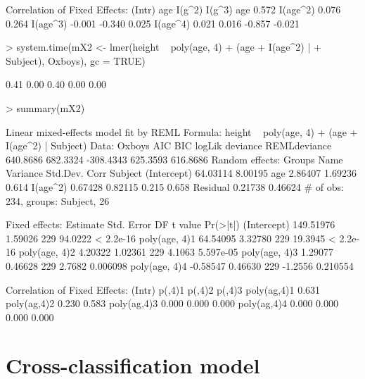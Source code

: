 \documentclass[12pt]{article}
\begin{document}
\begin{Schunk}
\begin{Soutput}
Correlation of Fixed Effects:
         (Intr) age    I(g^2) I(g^3)
age       0.572                     
I(age^2)  0.076  0.264              
I(age^3) -0.001 -0.340  0.025       
I(age^4)  0.021  0.016 -0.857 -0.021
\end{Soutput}
\begin{Sinput}
> system.time(mX2 <- lmer(height ~ poly(age, 4) + (age + I(age^2) | 
+     Subject), Oxboys), gc = TRUE)
\end{Sinput}
\begin{Soutput}
[1] 0.41 0.00 0.40 0.00 0.00
\end{Soutput}
\begin{Sinput}
> summary(mX2)
\end{Sinput}
\begin{Soutput}
Linear mixed-effects model fit by REML
Formula: height ~ poly(age, 4) + (age + I(age^2) | Subject) 
   Data: Oxboys 
      AIC      BIC    logLik deviance REMLdeviance
 640.8686 682.3324 -308.4343 625.3593     616.8686
Random effects:
 Groups   Name        Variance Std.Dev. Corr        
 Subject  (Intercept) 64.03114 8.00195              
          age          2.86407 1.69236  0.614       
          I(age^2)     0.67428 0.82115  0.215 0.658 
 Residual              0.21738 0.46624              
# of obs: 234, groups: Subject, 26

Fixed effects:
               Estimate Std. Error  DF t value  Pr(>|t|)
(Intercept)   149.51976    1.59026 229 94.0222 < 2.2e-16
poly(age, 4)1  64.54095    3.32780 229 19.3945 < 2.2e-16
poly(age, 4)2   4.20322    1.02361 229  4.1063 5.597e-05
poly(age, 4)3   1.29077    0.46628 229  2.7682  0.006098
poly(age, 4)4  -0.58547    0.46630 229 -1.2556  0.210554

Correlation of Fixed Effects:
            (Intr) p(,4)1 p(,4)2 p(,4)3
poly(ag,4)1 0.631                      
poly(ag,4)2 0.230  0.583               
poly(ag,4)3 0.000  0.000  0.000        
poly(ag,4)4 0.000  0.000  0.000  0.000 
\end{Soutput}
\end{Schunk}

\section{Cross-classification model}
\label{sec:CrossClassified}
\end{document}

